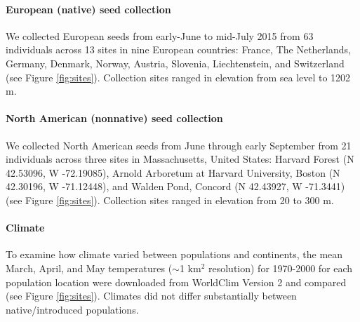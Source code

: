 \documentclass[12pt]{article}\usepackage[]{graphicx}\usepackage[]{color}
\begin{document}
	\paragraph{European (native) seed collection} We collected European seeds from early-June to mid-July 2015 from 63 individuals across 13 sites in nine European countries: France, The Netherlands, Germany, Denmark, Norway, Austria, Slovenia, Liechtenstein, and Switzerland (see Figure \ref{fig:sites}). Collection sites ranged in elevation from sea level  to 1202 m. %
	
   \paragraph{North American (nonnative) seed collection} We collected North American seeds from June through early September from 21 individuals across three sites in Massachusetts, United States:  Harvard Forest (N 42.53096, W -72.19085), Arnold Arboretum at Harvard University, Boston (N 42.30196, W -71.12448), and Walden Pond, Concord (N 42.43927, W -71.3441) (see Figure \ref{fig:sites}). Collection sites ranged in elevation from 20 to 300 m. 
	
	\paragraph{Climate}
	To examine how climate varied between populations and continents, the mean March, April, and May temperatures ($\sim$1 km$^2$ resolution) for 1970-2000 for each population location were downloaded from WorldClim Version 2 \parencite{Fick2017}  and compared (see Figure \ref{fig:sites}). Climates did not differ substantially between native/introduced populations.  %
	
\end{document}
